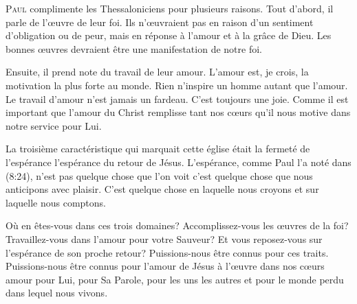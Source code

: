 


\lettrine{P}{aul} complimente les Thessaloniciens pour plusieurs raisons.
 Tout d'abord, il parle de l'œuvre de leur foi.
 Ils n'œuvraient pas en raison d'un sentiment d'obligation ou de peur,
 mais en réponse à l'amour et à la grâce de Dieu.
 Les bonnes œuvres devraient être une manifestation de notre foi.

Ensuite, il prend note du travail de leur amour. L'amour est, je crois,
 la motivation la plus forte au monde. Rien n'inspire un homme autant
 que l'amour. Le travail d'amour n'est jamais un fardeau.
 C'est toujours une joie. Comme il est important que l'amour du Christ
 remplisse tant nos cœurs qu'il nous motive dans notre service pour Lui.


La troisième caractéristique qui marquait cette église était la fermeté
 de l'espérance \ocadr l'espérance du retour de Jésus.
 L'espérance, comme Paul l'a noté dans (8:24),
 n'est pas quelque chose que l'on voit \ocadr c'est quelque chose que nous
 anticipons avec plaisir. C'est quelque chose en laquelle nous croyons
 et sur laquelle nous comptons.

Où en êtes-vous dans ces trois domaines? Accomplissez-vous
 les œuvres de la foi? Travaillez-vous dans l'amour pour votre Sauveur?
 Et vous reposez-vous sur l'espérance de son proche retour?
 Puissions-nous être connus pour ces traits. Puissions-nous être connus
 pour l'amour de Jésus à l'œuvre dans nos cœurs
 \ocadr amour pour Lui, pour Sa Parole, pour les uns les autres 
 et pour le monde perdu dans lequel nous vivons.

\dvrule






